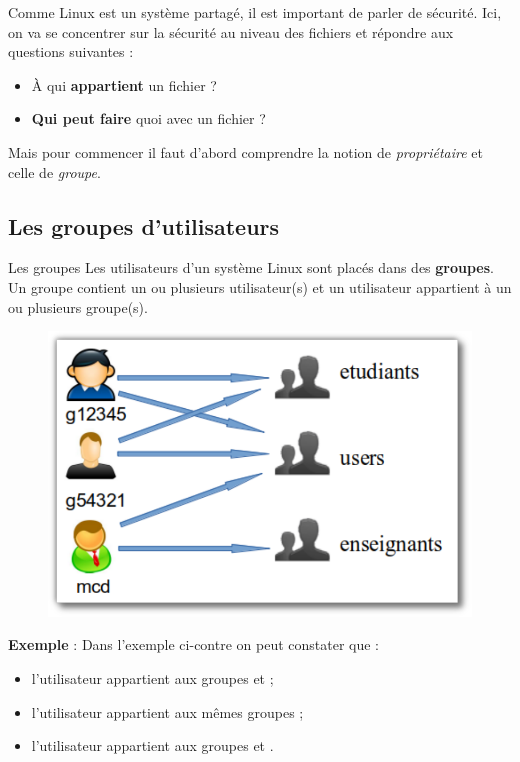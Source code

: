 \documentclass[a4paper,11pt]{style-esi/td}
\begin{document}
	Comme Linux est un système partagé, il est important de parler de sécurité. 
	Ici, on va se concentrer sur la sécurité au niveau des fichiers 
	et répondre aux questions suivantes :  
	\begin{itemize}
	\item À qui \textbf{appartient} un fichier ?
	\item \textbf{Qui peut faire} quoi avec un fichier ?
	\end{itemize}

	Mais pour commencer il faut d'abord comprendre 
	la notion de \textit{propriétaire}
	et celle de \textit{groupe}. 

	\subsection{Les groupes d'utilisateurs}

		\begin{theorie}{Les groupes}
			Les utilisateurs d'un système Linux sont placés dans des \textbf{groupes}. 
			Un groupe contient un ou plusieurs utilisateur(s) 
			et un utilisateur appartient à un ou plusieurs groupe(s).
		\end{theorie}

		\begin{figure}
			\vspace{-1em}
			\includegraphics[width=.3\textwidth]{image/groupes.pdf}
			\vspace{-3em}
		\end{figure}
		\textbf{Exemple} :
		Dans l'exemple ci-contre on peut constater que :
		\begin{itemize}
		\item 
			l'utilisateur  appartient 
			aux groupes  et  ;
		\item 
			l'utilisateur  appartient aux mêmes groupes ;
		\item 
			l'utilisateur  appartient 
			aux groupes  et .
		\end{itemize}
		
\end{document}
